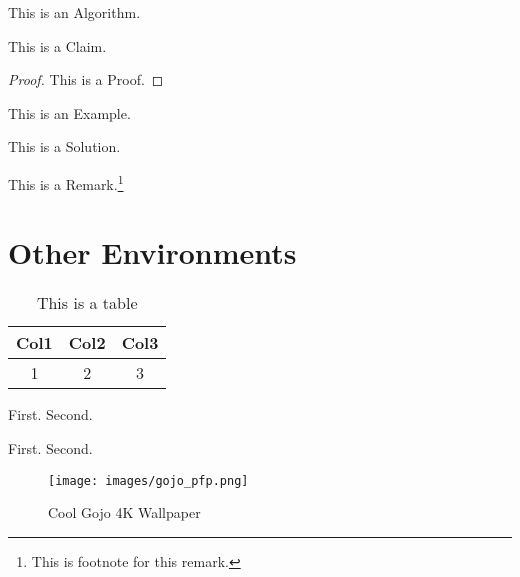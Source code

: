 \documentclass[12pt]{scrartcl}
\begin{document}
\begin{algorithm}
[Name]
This is an Algorithm.
\end{algorithm}

\begin{claim}
[Name]
This is a Claim.
\end{claim}

\begin{proof}
This is a Proof.
\end{proof}

\begin{example}
[Name]
This is an Example.
\end{example}

\begin{soln}
This is a Solution.
\end{soln}

\hrulebar

\begin{remark}
[Name]
  This is a Remark.\footnote{This is footnote for this remark.}
\end{remark}

\newpage

\section{Other Environments}


\begin{table}[htbp]
\label{tab:1}
\centering
\begin{tabular}{||c c c||}

\hline
Col1 & Col2 & Col3 \\ [0.5ex]
\hline\hline

1 & 2 & 3 \\
\hline

\end{tabular}
\caption{This is a table}
\end{table}

\begin{enumerate}[(a)]
  \ii First.
  \ii Second.
\end{enumerate}

\begin{itemize}
  \ii First.
  \ii Second.
\end{itemize}

\begin{figure}[htbp]
    \centering
    \texttt{[image: images/gojo\_pfp.png]}
    \caption{Cool Gojo 4K Wallpaper}
    \label{fig:gojo1}
\end{figure}
\end{document}
